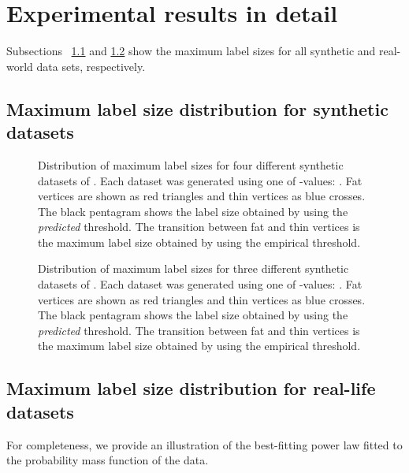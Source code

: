 \documentclass{article}
\theoremstyle{remark}
\begin{document}
\section{Experimental results in detail}\label{App:ExpRes}
Subsections ~\ref{App:ExpRes:MaxLabelSyn} and \ref{App:ExpRes:MaxLabelEmp}  show the maximum label sizes for all synthetic and real-world data sets, respectively.


\subsection{Maximum label size distribution for synthetic datasets}\label{App:ExpRes:MaxLabelSyn}
\begin{figure}[!ht]
\centering
{}
\quad
{}
\caption{Distribution of maximum label sizes for four different synthetic datasets of . Each dataset was generated using one of -values: . Fat vertices are shown as red triangles and thin vertices as blue crosses. The black pentagram shows the label size obtained by using the \emph{predicted} threshold. The transition between fat and thin vertices is the maximum label size obtained by using the empirical threshold.}\label{fig:synthetic300}\end{figure}


\begin{figure}[!ht]
\centering
{}
\quad
{}\caption{Distribution of maximum label sizes for three different synthetic datasets of . Each dataset was generated using one of -values: . Fat vertices are shown as red triangles and thin vertices as blue crosses. The black pentagram shows the label size obtained by using the \emph{predicted} threshold. The transition between fat and thin vertices is the maximum label size obtained by using the empirical threshold.}\label{fig:synthetic1M}\end{figure}
\clearpage

\subsection{Maximum label size distribution for real-life datasets}\label{App:ExpRes:MaxLabelEmp}
For completeness,  we  provide an illustration of the best-fitting power law fitted to the probability mass function of the data.
\end{document}
